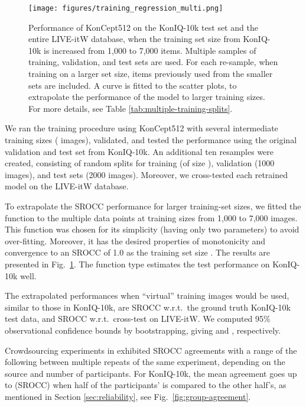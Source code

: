 \documentclass[10pt,journal,compsoc]{IEEEtran}
\begin{document}
\begin{figure}[!t]
\vspace{-10pt}
\centering
\texttt{[image: figures/training\_regression\_multi.png]}
\caption{Performance of KonCept512 on the KonIQ-10k test set and the entire LIVE-itW database, when the training set size from KonIQ-10k is increased from 1,000 to 7,000 items. Multiple samples of training, validation, and test sets are used. For each re-sample, when training on a larger set size, items previously used from the smaller sets are included. A curve is fitted to the scatter plots, to extrapolate the performance of the model to larger training sizes. For more details, see Table \ref{tab:multiple-training-splits}.}
\label{fig:extrapolation-live}
\vspace{-15pt}
\end{figure}
We ran the training procedure using KonCept512 with several intermediate training sizes ( images), validated, and tested the performance using the original validation and test set from KonIQ-10k. An additional ten resamples were created, consisting of random splits for training (of size ), validation (1000 images), and test sets (2000 images). Moreover, we cross-tested each retrained model on the LIVE-itW database.

To extrapolate the SROCC performance for larger training-set sizes, we fitted the function  to the multiple data points at training sizes  from 1,000 to 7,000 images. This function was chosen for its simplicity (having only two parameters) to avoid over-fitting. Moreover, it has the desired properties of monotonicity and convergence to an SROCC of 1.0 as the training set size . The results are presented in Fig.~\ref{fig:extrapolation-live}.  The function type estimates the test performance on KonIQ-10k well.

The extrapolated performances when  ``virtual'' training images would be used, similar to those in KonIQ-10k, are  SROCC w.r.t.\ the ground truth KonIQ-10k test data, and  SROCC w.r.t.\ cross-test on LIVE-itW. We computed 95\% observational confidence bounds by bootstrapping, giving   and , respectively. 


Crowdsourcing experiments in \cite{QoMEXReliability,ponomarenko:2009tid2008} exhibited SROCC agreements with a range of the following  between multiple repeats of the same experiment, depending on the source and number of participants. For KonIQ-10k, the mean agreement goes up to  (SROCC) when half of the participants' is compared to the other half's, as mentioned in Section \ref{sec:reliability}, see Fig.~\ref{fig:group-agreement}. 
\end{document}
